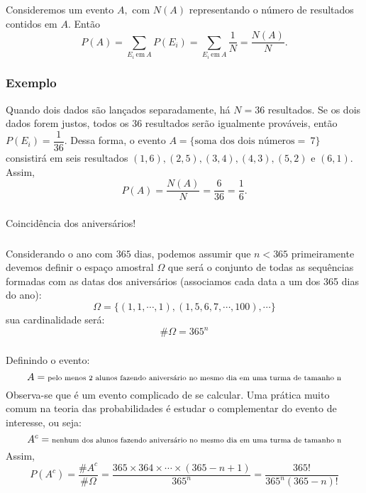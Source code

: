 \documentclass[14pt,aspectratio=1610]{beamer}
\begin{document}
\begin{frame}{}
\frametitle{}
\begin{block}{}
\justifying
Consideremos um evento $A,$ com $N(A)$ representando o número de resultados contidos em $A.$ Então $$P(A)=\sum_{E_{i}\ \textrm{em}\ A}P(E_{i})=\sum_{E_{i}\ \textrm{em}\ A}\dfrac{1}{N}=\dfrac{N(A)}{N}.$$
\end{block}
\end{frame}

\begin{frame}{}
\frametitle{Exemplo}
\begin{block}{}
\justifying
Quando dois dados são lançados separadamente, há $N=36$ resultados. Se os dois dados forem justos, todos os $36$ resultados serão igualmente prováveis, então
$P(E_{i})=\dfrac{1}{36}$. Dessa forma, o evento $A=\{\textrm{soma dos dois números}=\ 7\}$ consistirá em seis resultados $(1,6), (2,5), (3,4), (4,3), (5,2)$ e $(6,1).$ Assim, $$P(A)=\dfrac{N(A)}{N}=\dfrac{6}{36}=\dfrac{1}{6}.$$
\end{block}
\end{frame}

\begin{frame}[fragile]{}
\frametitle{}
\begin{block}{}
\centering
Coincidência dos aniversários!
\end{block}
\end{frame}

\begin{frame}{}
\frametitle{}
\begin{block}{}
\justifying
Considerando o ano com $365$ dias, podemos assumir que $n<365$ primeiramente devemos definir o espaço amostral $\Omega$ que será o conjunto de todas as sequências formadas com as datas dos aniversários (associamos cada data a um dos 365 dias do ano):
$$\Omega=\{(1,1,\cdots,1),(1,5,6,7,\cdots,100),\cdots\}$$
sua cardinalidade será: $$\# \Omega=365^{n}$$

\end{block}
\end{frame}

\begin{frame}{}
\frametitle{}
\begin{block}{}
\justifying
Definindo o evento:
$${\scriptsize A=\textrm{pelo menos 2 alunos fazendo aniversário no mesmo dia em uma turma de tamanho n}}$$
Observa-se que é um evento complicado de se calcular. Uma prática muito comum na teoria das probabilidades é estudar o complementar do evento de interesse, ou seja:
$${\scriptsize A^{c}=\textrm{nenhum dos alunos fazendo aniversário no mesmo dia em uma turma de tamanho n}}$$
Assim, 
$$P(A^{c})=\dfrac{\# A^{c}}{\# \Omega}=\dfrac{365\times 364\times \cdots \times (365-n+1)}{365^{n}}=\dfrac{365!}{365^{n}(365-n)!}$$
\end{block}
\end{frame}
\end{document}
